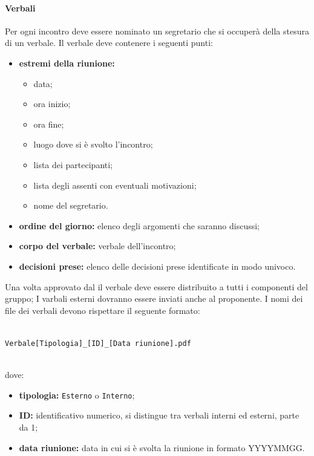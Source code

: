             \paragraph{Verbali}\label{sec:verbali}
            Per ogni incontro deve essere nominato un segretario che si occuperà della stesura di un verbale. Il verbale deve contenere i seguenti punti:
            \begin{itemize}
                \item \textbf{estremi della riunione:}
                    \begin{itemize}
                        \item data;
                        \item ora inizio;
                        \item ora fine;
                        \item luogo dove si è svolto l'incontro;
                        \item lista dei partecipanti;
                        \item lista degli assenti con eventuali motivazioni;
                        \item nome del segretario.
                    \end{itemize}
                \item \textbf{ordine del giorno:} elenco degli argomenti che saranno discussi;
                \item \textbf{corpo del verbale:} verbale dell'incontro;
                \item \textbf{decisioni prese:} elenco delle decisioni prese identificate in modo univoco.
            \end{itemize}
            Una volta approvato dal \responsabilediprogetto{} il verbale deve essere distribuito a tutti i componenti del gruppo; I varbali esterni dovranno essere inviati anche al proponente.
            I nomi dei file dei verbali devono rispettare il seguente formato:\\\\
            \centerline{\texttt{Verbale[Tipologia]\_[ID]\_[Data riunione].pdf}}\\
            dove:
            \begin{itemize}
                \item \textbf{tipologia:} \texttt{Esterno} o \texttt{Interno};
                \item \textbf{ID:} identificativo numerico, si distingue tra verbali interni ed esterni, parte da 1;
                \item \textbf{data riunione:} data in cui si è svolta la riunione in formato YYYYMMGG.
            \end{itemize}
